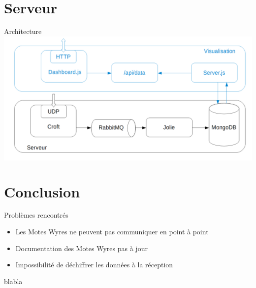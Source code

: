 \documentclass{beamer}
\begin{document}
\section{Serveur}
\begin{frame}{Architecture}
	\includegraphics[scale=0.3]{M2M.png}
\end{frame}

\section{Conclusion}
\begin{frame}
	\begin{block}{Problèmes rencontrés}
		\begin{itemize}
			\item Les Motes Wyres ne peuvent pas communiquer en point à point
			\item Documentation des Motes Wyres pas à jour
			\item Impossibilité de déchiffrer les données à la réception
		\end{itemize}
	\end{block}
\end{frame}

\begin{frame}
	\begin{block}{blabla}
		
	\end{block}
\end{frame}
\end{document}

